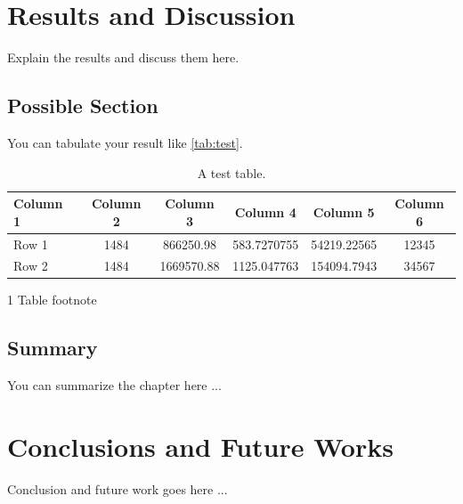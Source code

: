 \documentclass[a4paper,12pt,oneside]{book}
\begin{document}
\chapter{Results and Discussion} \label{chap:results_disc}
Explain the results and discuss them here.

\section{Possible Section}

You can tabulate your result like \autoref{tab:test}.

\begin{table}[!hbt]
\centering
\begin{threeparttable}
\caption{A test table.}
\label{tab:test}
\begin{tabular}{@{}l*5c@{}} \toprule							
\textbf{Column 1}	&	\textbf{Column 2}	&	\textbf{Column 3}	&	\textbf{Column 4}	&	\textbf{Column 5} &	\textbf{Column 6} \\ \midrule
Row 1\tnote{1}	&	1484\tnote{1}	&	866250.98	&	583.7270755	&	54219.22565 & 12345\\ 
Row 2	&	1484	&	1669570.88	&	1125.047763	&	154094.7943 & 34567 \\ \bottomrule
\end{tabular}
\end{threeparttable}
\begin{tablenotes}
\item [1] Table footnote
\end{tablenotes}
\end{table}

\section{Summary}
You can summarize the chapter here ...

\chapter{Conclusions and Future Works}\label{chap:concl}
Conclusion and future work goes here ...


%

\backmatter
%
\renewcommand\bibname{References}
\newpage
{} \label{refs}
\end{document}
